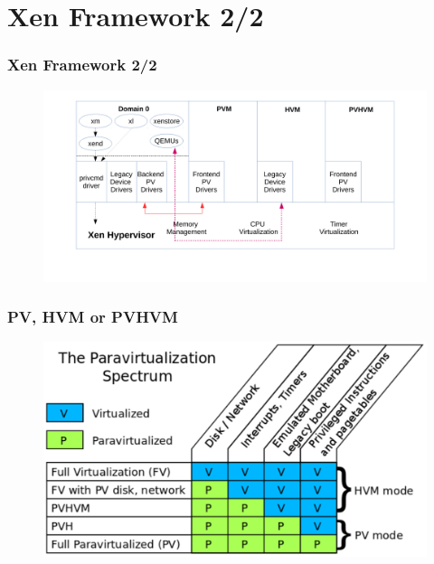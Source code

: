 \documentclass[aspectratio=169]{beamer}
\begin{document}

\section{Xen Framework 2/2}
\begin{frame}
\frametitle{Xen Framework 2/2}
\begin{figure}
\includegraphics[width=1.0\linewidth]{figures/xen.pdf}
\end{figure}
\end{frame}


\begin{frame}
\frametitle{PV, HVM or PVHVM}
\begin{figure}
\includegraphics[width=0.8\linewidth]{figures/spectrum.pdf}
\end{figure}
\end{frame}

\end{document}
